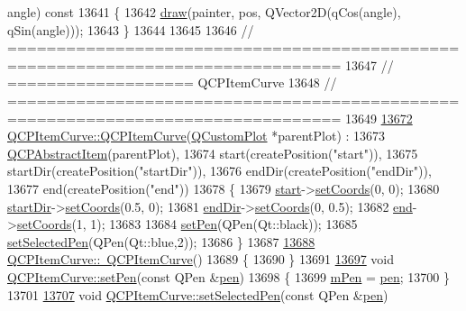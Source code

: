 \begin{DoxyCode}
      angle)\textcolor{keyword}{ const}
13641 \textcolor{keyword}{}\{
13642   \hyperlink{a00046_ac4b2fa94bd27b2f008b5fc090fcd7c0b}{draw}(painter, pos, QVector2D(qCos(angle), qSin(angle)));
13643 \}
13644 
13645 
13646 \textcolor{comment}{// ================================================================================}
13647 \textcolor{comment}{// =================== QCPItemCurve}
13648 \textcolor{comment}{// ================================================================================}
13649 
\hypertarget{a00115_source_l13672}{}\hyperlink{a00034_ac9b7508bb5c8827e1a7a6199f8c82bec}{13672} \hyperlink{a00034_ac9b7508bb5c8827e1a7a6199f8c82bec}{QCPItemCurve::QCPItemCurve}(\hyperlink{a00030_d8/d00/a00186}{QCustomPlot} *parentPlot) :
13673   \hyperlink{a00022}{QCPAbstractItem}(parentPlot),
13674   start(createPosition(\textcolor{stringliteral}{"start"})),
13675   startDir(createPosition(\textcolor{stringliteral}{"startDir"})),
13676   endDir(createPosition(\textcolor{stringliteral}{"endDir"})),
13677   end(createPosition(\textcolor{stringliteral}{"end"}))
13678 \{
13679   \hyperlink{a00034_a20c3b5ea31c33764f4f30c2ec7ae518b}{start}->\hyperlink{a00038_aa988ba4e87ab684c9021017dcaba945f}{setCoords}(0, 0);
13680   \hyperlink{a00034_aa124bf66c09cc51c627fb49db8bf8a7b}{startDir}->\hyperlink{a00038_aa988ba4e87ab684c9021017dcaba945f}{setCoords}(0.5, 0);
13681   \hyperlink{a00034_a28181a9dee9cc3c3da83a883221bd2d0}{endDir}->\hyperlink{a00038_aa988ba4e87ab684c9021017dcaba945f}{setCoords}(0, 0.5);
13682   \hyperlink{a00034_a24ecbb195b32a08b42b61c2cf08a1b4d}{end}->\hyperlink{a00038_aa988ba4e87ab684c9021017dcaba945f}{setCoords}(1, 1);
13683   
13684   \hyperlink{a00034_a034be908440aec785c34b92843461221}{setPen}(QPen(Qt::black));
13685   \hyperlink{a00034_a375b917669f868c5a106bf2f1ab7c26d}{setSelectedPen}(QPen(Qt::blue,2));
13686 \}
13687 
\hypertarget{a00115_source_l13688}{}\hyperlink{a00034_ae36f20fd5deff2f1443a7c53eaa95c81}{13688} \hyperlink{a00034_ae36f20fd5deff2f1443a7c53eaa95c81}{QCPItemCurve::~QCPItemCurve}()
13689 \{
13690 \}
13691 
\hypertarget{a00115_source_l13697}{}\hyperlink{a00034_a034be908440aec785c34b92843461221}{13697} \textcolor{keywordtype}{void} \hyperlink{a00034_a034be908440aec785c34b92843461221}{QCPItemCurve::setPen}(\textcolor{keyword}{const} QPen &\hyperlink{a00116_a1f13fffa0a0faac34ec342973e613a4a}{pen})
13698 \{
13699   \hyperlink{a00034_a7ef92988d1db2e4d0311e34c0a57fe42}{mPen} = \hyperlink{a00034_abc6321e55a9ba1a0c7df407843dfa252}{pen};
13700 \}
13701 
\hypertarget{a00115_source_l13707}{}\hyperlink{a00034_a375b917669f868c5a106bf2f1ab7c26d}{13707} \textcolor{keywordtype}{void} \hyperlink{a00034_a375b917669f868c5a106bf2f1ab7c26d}{QCPItemCurve::setSelectedPen}(\textcolor{keyword}{const} QPen &\hyperlink{a00116_a1f13fffa0a0faac34ec342973e613a4a}{pen})

\end{DoxyCode}

